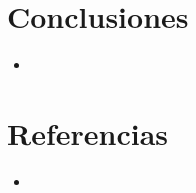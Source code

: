 \documentclass{article}
\begin{document}
        

    \section{Conclusiones}
        \begin{itemize}
            \item 
        \end{itemize}
        
    \section{Referencias}
    
    \begin{itemize}			
    	\item \url{ }
    \end{itemize}	

\end{document}
